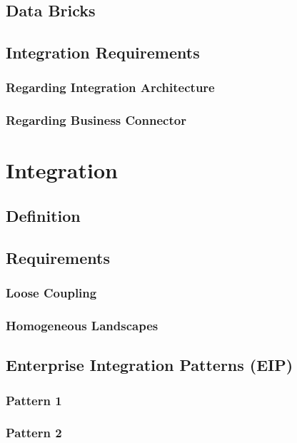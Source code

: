 \documentclass[
     12pt,         %
     a4paper,      %
     BCOR10mm,     %
     DIV14,        %
     ]{scrreprt}
\begin{document}
\section{Data Bricks}

\section{Integration Requirements}

\subsection{Regarding Integration Architecture}

\subsection{Regarding Business Connector}

\chapter{Integration}

\section{Definition}

\section{Requirements}

\subsection{Loose Coupling}

\subsection{Homogeneous Landscapes}

\section{Enterprise Integration Patterns (EIP)}

\subsection{Pattern 1}

\subsection{Pattern 2}
\end{document}
